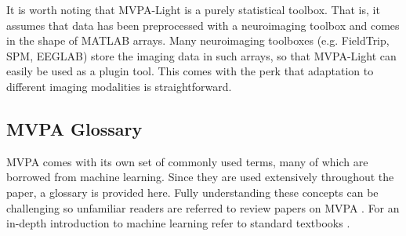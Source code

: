 \documentclass[utf8]{frontiersSCNS} %
\begin{document}
It is worth noting that MVPA-Light is a purely statistical toolbox. That is, it assumes that data has been preprocessed with a neuroimaging toolbox and comes in the shape of MATLAB arrays. Many neuroimaging toolboxes (e.g. FieldTrip, SPM, EEGLAB) store the imaging  data in such arrays, so that MVPA-Light can easily be used as a plugin tool. This comes with the perk that adaptation to different imaging modalities is straightforward.

\subsection{MVPA Glossary}

MVPA comes with its own set of commonly used terms, many of which are borrowed from machine learning. Since they are used extensively throughout the paper, a glossary is provided here. Fully understanding these concepts can be challenging so unfamiliar readers are referred to review papers on MVPA  \citep{Mur2009,Misaki2010ComparisonFMRI,Grootswagers2017DecodingData,Pereira2009,Varoquaux2017}. For an in-depth introduction to machine learning refer to standard textbooks \citep{James2013,Hastie2009,Bishop2007}.
\end{document}
